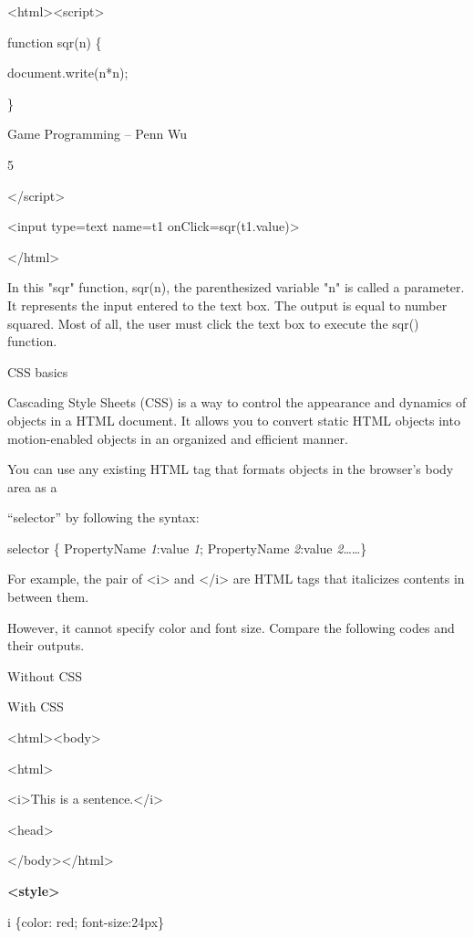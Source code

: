 \documentclass[
]{article}
\begin{document}
\textless html\textgreater\textless script\textgreater{}

function sqr(n) \{

document.write(n*n);

\}

Game Programming -- Penn Wu

5

\protect\hypertarget{index_split_001.htmlux5cux23p6}{}{}\textless/script\textgreater{}

\textless input type=text name=t1 onClick=sqr(t1.value)\textgreater{}

\textless/html\textgreater{}

In this "sqr" function, sqr(n), the parenthesized variable "n" is called
a parameter. It represents the input entered to the text box. The output
is equal to number squared. Most of all, the user must click the text
box to execute the sqr() function.

CSS basics

Cascading Style Sheets (CSS) is a way to control the appearance and
dynamics of objects in a HTML document. It allows you to convert static
HTML objects into motion-enabled objects in an organized and efficient
manner.

You can use any existing HTML tag that formats objects in the browser's
body area as a

``selector'' by following the syntax:

selector \{ PropertyName \emph{1}:value \emph{1}; PropertyName
\emph{2}:value \emph{2}\ldots\ldots\}

For example, the pair of \textless i\textgreater{} and
\textless/i\textgreater{} are HTML tags that italicizes contents in
between them.

However, it cannot specify color and font size. Compare the following
codes and their outputs.

Without CSS

With CSS

\textless html\textgreater\textless body\textgreater{}

\textless html\textgreater{}

\textless i\textgreater This is a sentence.\textless/i\textgreater{}

\textless head\textgreater{}

\textless/body\textgreater\textless/html\textgreater{}

\textbf{\textless style\textgreater{}}

i \{color: red; font-size:24px\}
\end{document}
